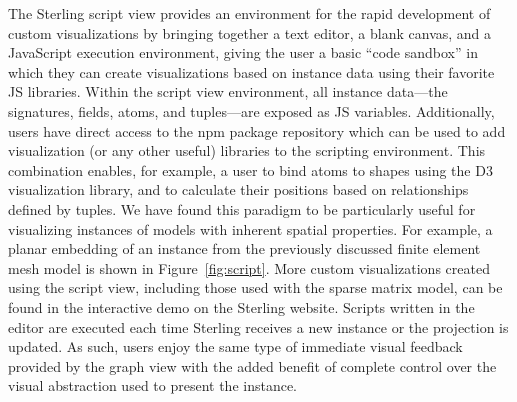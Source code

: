 \documentclass[runningheads]{llncs}
\begin{document}
The Sterling script view provides an environment for the rapid development of custom visualizations by bringing together a text editor, a blank canvas, and a JavaScript execution environment, giving the user a basic ``code sandbox'' in which they can create visualizations based on instance data using their favorite JS libraries.
Within the script view environment, all instance data---the signatures, fields, atoms, and tuples---are exposed as JS variables. 
Additionally, users have direct access to the npm package repository which can be used to add visualization (or any other useful) libraries to the scripting environment.
This combination enables, for example, a user to bind atoms to shapes using the D3 visualization library, and to calculate their positions based on relationships defined by tuples.
We have found this paradigm to be particularly useful for visualizing instances of models with inherent spatial properties.
For example, a planar embedding of an instance from the previously discussed finite element mesh model is shown in Figure~\ref{fig:script}. More custom visualizations created using the script view, including those used with the sparse matrix model, can be found in the interactive demo on the Sterling website.
Scripts written in the editor are executed each time Sterling receives a new instance or the projection is updated. 
As such, users enjoy the same type of immediate visual feedback provided by the graph view with the added benefit of complete control over the visual abstraction used to present the instance.
\end{document}
